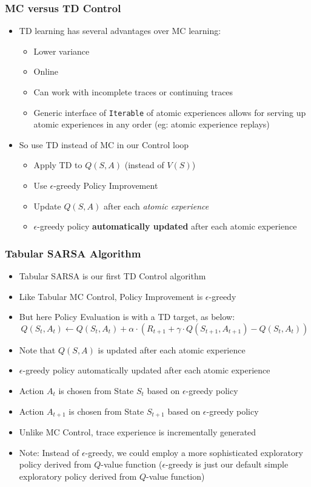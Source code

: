 \documentclass[handout]{beamer}
\begin{document}
\begin{frame}
\frametitle{MC versus TD Control}
\pause
\begin{itemize}[<+->]
\item TD learning has several advantages over MC learning:
\begin{itemize}[<+->]
\item Lower variance
\item Online
\item Can work with incomplete traces or continuing traces
\item Generic interface of \lstinline{Iterable} of atomic experiences allows for serving up atomic experiences in any order (eg: atomic experience replays)
\end{itemize}
\pause
\item So use TD instead of MC in our Control loop
\pause
\begin{itemize}[<+->]
\item Apply TD to $Q(S,A)$ (instead of $V(S)$)
\item Use $\epsilon$-greedy Policy Improvement
\item Update $Q(S,A)$ after each {\em atomic experience}
\item $\epsilon$-greedy policy {\bf automatically updated} after each atomic experience
\end{itemize}
\end{itemize}
\end{frame}

\begin{frame}
\frametitle{Tabular SARSA Algorithm}
\begin{itemize}[<+->]
\item Tabular SARSA is our first TD Control algorithm
\item Like Tabular MC Control, Policy Improvement is $\epsilon$-greedy
\item But here Policy Evaluation is with a TD target, as below:
$$Q(S_t,A_t) \leftarrow Q(S_t,A_t) + \alpha \cdot (R_{t+1} + \gamma \cdot Q(S_{t+1}, A_{t+1}) - Q(S_t,A_t))$$
\item Note that $Q(S,A)$ is updated after each atomic experience
\item $\epsilon$-greedy policy automatically updated after each atomic experience
\item Action $A_t$ is chosen from State $S_t$ based on $\epsilon$-greedy policy
\item Action $A_{t+1}$ is chosen from State $S_{t+1}$ based on $\epsilon$-greedy policy
\item Unlike MC Control, trace experience is incrementally generated
\item Note: Instead of $\epsilon$-greedy, we could employ a more sophisticated exploratory policy derived from $Q$-value function ($\epsilon$-greedy is just our default simple exploratory policy derived from $Q$-value function)
\end{itemize}
\end{frame}
\end{document}

